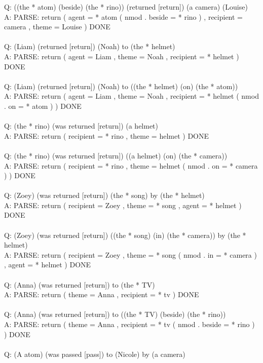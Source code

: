 \documentclass{article} \usepackage{iclr2022_conference,times}
\begin{document}
{Q: ((the * atom) (beside) (the * rino)) (returned [return]) (a camera) (Louise) \\
A: PARSE: return ( agent = * atom ( nmod . beside = * rino ) , recipient = camera , theme = Louise ) DONE \\
 \\
Q: (Liam) (returned [return]) (Noah) to (the * helmet) \\
A: PARSE: return ( agent = Liam , theme = Noah , recipient = * helmet ) DONE \\
 \\
Q: (Liam) (returned [return]) (Noah) to ((the * helmet) (on) (the * atom)) \\
A: PARSE: return ( agent = Liam , theme = Noah , recipient = * helmet ( nmod . on = * atom ) ) DONE \\
 \\
Q: (the * rino) (was returned [return]) (a helmet) \\
A: PARSE: return ( recipient = * rino , theme = helmet ) DONE \\
 \\
Q: (the * rino) (was returned [return]) ((a helmet) (on) (the * camera)) \\
A: PARSE: return ( recipient = * rino , theme = helmet ( nmod . on = * camera ) ) DONE \\
 \\
Q: (Zoey) (was returned [return]) (the * song) by (the * helmet) \\
A: PARSE: return ( recipient = Zoey , theme = * song , agent = * helmet ) DONE \\
 \\
Q: (Zoey) (was returned [return]) ((the * song) (in) (the * camera)) by (the * helmet) \\
A: PARSE: return ( recipient = Zoey , theme = * song ( nmod . in = * camera ) , agent = * helmet ) DONE \\
 \\
Q: (Anna) (was returned [return]) to (the * TV) \\
A: PARSE: return ( theme = Anna , recipient = * tv ) DONE \\
 \\
Q: (Anna) (was returned [return]) to ((the * TV) (beside) (the * rino)) \\
A: PARSE: return ( theme = Anna , recipient = * tv ( nmod . beside = * rino ) ) DONE \\
 \\
Q: (A atom) (was passed [pass]) to (Nicole) by (a camera) \\
}
\end{document}
